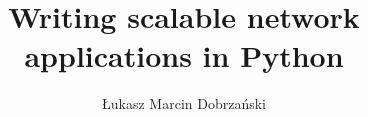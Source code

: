 \documentclass[msc,oneside,11pt,norunningheaders]{ubcthesiscpbl}
\title{Writing scalable network applications in Python}
\subtitle{}
\author{Łukasz Marcin Dobrzański}
\newcommand{\ifdoDoubleSpace}[1]{}
\def\setpageforTOC{\setcounter{page}{2}}
\def\setpageforTOC{}
\def\dedication#1{
  \chapter[Dedication]{} %
  \thispagestyle{plain}   %
  \vspace{6cm}
  \begin{center}
    #1
  \end{center}
  }
\begin{document}

\ifdoDoubleSpace{ \begin{singlespace} }

\frontmatter

\maketitle
\newpage\thispagestyle{empty}\newpage  %


\newpage\thispagestyle{empty}\newpage  %
\setpageforTOC

\tableofcontents
\listoffigures



		
\newpage				%
\thispagestyle{plain}		%
\mainmatter			%

\ifdoDoubleSpace{ \end{singlespace} }

     
\begin{spacing}{1.0}
	
	
\end{spacing}

	
\end{document}

